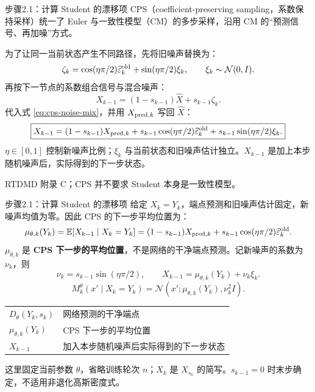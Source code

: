 \documentclass[10pt,aspectratio=169]{beamer}
\newcommand{\E}{\mathbb E}
\newcommand{\N}{\mathcal N}
\newcommand{\sourceline}[1]{\par{\scriptsize\color{gray}#1}\par}
\begin{document}
\begin{frame}{步骤2.1：计算 Student 的漂移项}
\small
CPS（coefficient-preserving sampling，系数保持采样）统一了 Euler 与一致性模型（CM）的多步采样，沿用 CM 的“预测信号、再加噪”方式。

为了让同一当前状态产生不同路径，先将旧噪声替换为：
\begin{equation}\label{eq:cps-noise-mix}
\zeta_k=\cos(\eta\pi/2)\widehat\varepsilon_k^{\rm old}
+\sin(\eta\pi/2)\xi_k,\qquad\xi_k\sim\N(0,I).
\end{equation}
再按下一节点的系数组合信号与混合噪声：
\begin{equation}\label{eq:cps-combination}
X_{k-1}=(1-s_{k-1})\widehat X+s_{k-1}\zeta_k.
\end{equation}
代入式 \eqref{eq:cps-noise-mix}，并用 $X_{{\rm pred},k}$ 写回 $\widehat X$：
\begin{equation}\label{eq:cps-step}
\boxed{X_{k-1}=(1-s_{k-1})X_{{\rm pred},k}
+s_{k-1}\cos(\eta\pi/2)\widehat\varepsilon_k^{\rm old}
+s_{k-1}\sin(\eta\pi/2)\xi_k.}
\end{equation}
$\eta\in[0,1]$ 控制新噪声比例；$\xi_k$ 与当前状态和旧噪声估计独立。$X_{k-1}$ 是加上本步随机噪声后，实际得到的下一步状态。
\sourceline{RTDMD 附录 C；CPS 并不要求 Student 本身是一致性模型。}
\end{frame}

\begin{frame}{步骤2.1：计算 Student 的漂移项}
\small
给定 $X_k=Y_k$，端点预测和旧噪声估计固定，新噪声均值为零。因此 CPS 的下一步平均位置为：
\begin{equation}\label{eq:cps-mean}
\mu_{\theta,k}(Y_k)=\E[X_{k-1}\mid X_k=Y_k]
=(1-s_{k-1})X_{{\rm pred},k}
+s_{k-1}\cos(\eta\pi/2)\widehat\varepsilon_k^{\rm old}.
\end{equation}
$\mu_{\theta,k}$ 是 \textbf{CPS 下一步的平均位置}，不是网络的干净端点预测。记新噪声的系数为 $\nu_k$，则
\begin{equation}\label{eq:cps-sample-mean}
\nu_k=s_{k-1}\sin(\eta\pi/2),\qquad
X_{k-1}=\mu_{\theta,k}(Y_k)+\nu_k\xi_k.
\end{equation}
\begin{equation}\label{eq:cps-kernel}
M_k^\theta(x'\mid X_k=Y_k)=\N(x';\mu_{\theta,k}(Y_k),\nu_k^2I).
\end{equation}
\begin{center}
\begin{tabular}{ll}
\toprule
$D_\theta(Y_k,s_k)$ & 网络预测的干净端点\\
$\mu_{\theta,k}(Y_k)$ & CPS 下一步的平均位置\\
$X_{k-1}$ & 加入本步随机噪声后实际得到的下一步状态\\
\bottomrule
\end{tabular}
\end{center}
\sourceline{这里固定当前参数 $\theta$，省略训练轮次 $n$；$X_k$ 是 $X_{s_k}$ 的简写。$s_{k-1}=0$ 时末步确定，不适用非退化高斯密度式。}
\end{frame}
\end{document}

